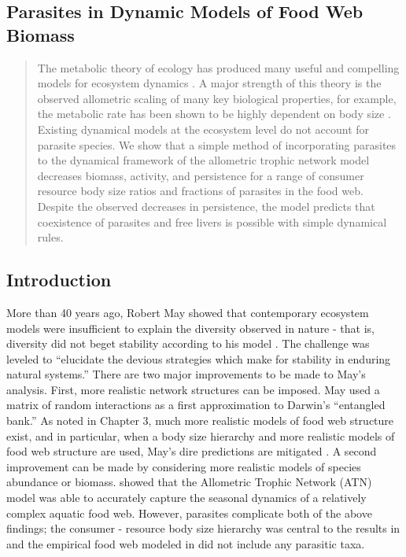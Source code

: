 \documentclass[/home/nkappler/Research/Dissertation/dissertation.tex]{subfiles}
\begin{document}
\begin{bibunit}
\chapter{Parasites in Dynamic Models of Food Web Biomass}

\begin{abstract}

The metabolic theory of ecology has produced many useful and compelling models
for ecosystem dynamics \cite*{Yodzis1992, Williams2007, Molnar2012, Boit2012}. A
major strength of this theory is the observed allometric scaling of many key
biological properties, for example, the metabolic rate has been shown to be
highly dependent on body size \cite*{Brown2004}. Existing dynamical models at
the ecosystem level do not account for parasite species. We show that a simple
method of incorporating parasites to the dynamical framework of the allometric
trophic network model decreases biomass, activity, and persistence for a range
of consumer resource body size ratios and fractions of parasites in the food
web. Despite the observed decreases in persistence, the model predicts that
coexistence of parasites and free livers is possible with simple dynamical
rules.

\end{abstract}

\newpage

\section{Introduction}

More than 40 years ago, Robert May showed that contemporary ecosystem models
were insufficient to explain the diversity observed in nature - that is,
diversity did not beget stability according to his model \cite*{May1972}. The
challenge was leveled to ``elucidate the devious strategies which make for
stability in enduring natural systems.'' There are two major improvements to be
made to May's analysis. First, more realistic network structures can be
imposed. May used a matrix of random interactions as a first approximation to
Darwin's ``entangled bank.'' As noted in Chapter 3, much more realistic models
of food web structure exist, and in particular, when a body size hierarchy and
more realistic models of food web structure are used, May's dire predictions
are mitigated \cite*{Allesina2012}. A second improvement can be made by
considering more realistic models of species abundance or biomass.
\cite*{Boit2012} showed that the Allometric Trophic Network (ATN) model was able
to accurately capture the seasonal dynamics of a relatively complex aquatic
food web. However, parasites complicate both of the above findings; the
consumer - resource body size hierarchy was central to the results in
\cite*{Allesina2012} and the empirical food web modeled in \cite*{Boit2012} did
not include any parasitic taxa. 
 

\end{bibunit}
\end{document}
